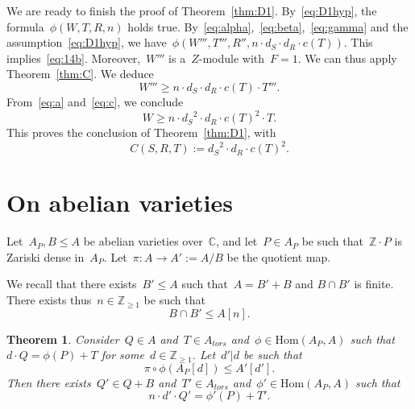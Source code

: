 \documentclass[12pt]{amsart}
\newtheorem{theorem}{Theorem}[section]
\newcommand{\Hom}{\mbox{Hom}}
\newcommand{\Z}{{\mathbb Z}}
\newcommand{\C}{{\mathbb C}}
\begin{document}
We are ready to finish the proof of Theorem~\ref{thm:D1}. By~\eqref{eq:D1hyp}, the formula~$\phi(W,T,R,n)$ holds true.
By~\eqref{eq:alpha},~\eqref{eq:beta},~\eqref{eq:gamma} and the assumption~\eqref{eq:D1hyp}, we have~$\phi(W''',T''',R'',n\cdot d_S\cdot d_R\cdot c(T))$. This implies~\eqref{eq:14b}. Moreover,~$W'''$ is a~$Z$-module with~$F=1$. We can thus apply Theorem~\ref{thm:C}. We deduce
\[
W'''\geq n\cdot d_S\cdot d_R\cdot c(T)\cdot T'''.
\]
From~\eqref{eq:a} and~\eqref{eq:c}, we conclude
\[
W\geq n\cdot {d_S}^2\cdot d_R\cdot c(T)^2\cdot  T.
\]
This proves the conclusion of Theorem~\ref{thm:D1}, with
\begin{equation}
C(S,R,T):={d_S}^2\cdot d_R\cdot c(T)^2.
\end{equation}


\section{On abelian varieties}

Let~$A_P,B\leq A$ be abelian varieties over~$\C$, and let~$P\in A_P$ be such that~$\Z\cdot P$ is Zariski dense in~$A_P$. Let~$\pi:A\to A':=A/B$ be the quotient map.

We recall that there exists~$B'\leq A$ such that~\(
A=B'+B\) and \(B\cap B'\) is finite.
There exists thus~$n\in\Z_{\geq1}$ be such that
\begin{equation}\label{eq:n}
B\cap B'\leq A[n]. 
\end{equation}

\begin{theorem}\label{thm:E1}
 Consider~$Q\in A$ and~$T\in {A}_{tors}$ and~$\phi\in\Hom(A_P,A)$ such that~$d\cdot Q=\phi(P)+T$ for some~$d\in\Z_{\geq1}$. Let~$d'|d$ be such that
\[
\pi\circ \phi(A_P[d])\leq A'[d'].
\]
Then there exists~$Q'\in Q+B$ and~$T'\in {A}_{tors}$ and~$\phi'\in \Hom(A_P,A)$ such that
\[
n\cdot d'\cdot Q'=\phi'(P)+T'.
\]
\end{theorem}
\end{document}
